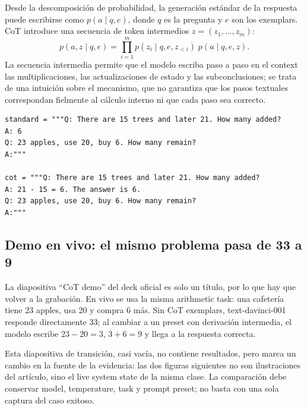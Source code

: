 Desde la descomposición de probabilidad, la generación estándar de la respuesta puede escribirse como $p(a\mid q,e)$, donde $q$ es la pregunta y $e$ son los exemplars. CoT introduce una secuencia de token intermedios $z=(z_1,\ldots,z_m)$:
\[
p(a,z\mid q,e)=\prod_{i=1}^{m}p(z_i\mid q,e,z_{<i})\;p(a\mid q,e,z).
\]
La secuencia intermedia permite que el modelo escriba paso a paso en el context las multiplicaciones, las actualizaciones de estado y las subconclusiones; se trata de una intuición sobre el mecanismo, que no garantiza que los pasos textuales correspondan fielmente al cálculo interno ni que cada paso sea correcto.

\begin{lstlisting}[caption={Diferencia mínima entre un few-shot prompt estándar y un CoT prompt}]
standard = """Q: There are 15 trees and later 21. How many added?
A: 6
Q: 23 apples, use 20, buy 6. How many remain?
A:"""

cot = """Q: There are 15 trees and later 21. How many added?
A: 21 - 15 = 6. The answer is 6.
Q: 23 apples, use 20, buy 6. How many remain?
A:"""
\end{lstlisting}


\subsection{Demo en vivo: el mismo problema pasa de 33 a 9}

La diapositiva ``CoT demo'' del deck oficial es solo un título, por lo que hay que volver a la grabación. En vivo se usa la misma arithmetic task: una cafetería tiene 23 apples, usa 20 y compra 6 más. Sin CoT exemplars, text-davinci-001 responde directamente 33; al cambiar a un preset con derivación intermedia, el modelo escribe $23-20=3$, $3+6=9$ y llega a la respuesta correcta.


Esta diapositiva de transición, casi vacía, no contiene resultados, pero marca un cambio en la fuente de la evidencia: las dos figuras siguientes no son ilustraciones del artículo, sino el live system state de la misma clase. La comparación debe conservar model, temperature, task y prompt preset; no basta con una sola captura del caso exitoso.


